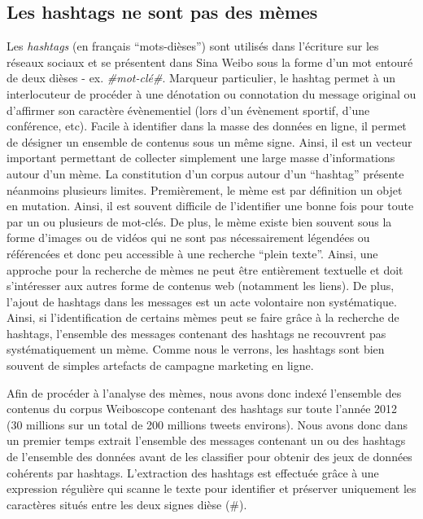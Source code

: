 \subsection[Les hashtags ne sont pas des mèmes]{Les hashtags ne sont pas des mèmes}
\label{sec:hashtags}

Les \textit{hashtags }(en fran\c{c}ais {\textquotedblleft}mots-dièses{\textquotedblright}) sont utilisés dans l{\textquoteright}écriture sur les réseaux sociaux et se présentent dans Sina Weibo sous la forme d{\textquoteright}un mot entouré de deux dièses - ex. \textit{\#mot-clé\#}. Marqueur particulier, le hashtag permet à un interlocuteur de procéder à une dénotation ou connotation du message original \citep{Romero2011} ou d{\textquoteright}affirmer son caractère évènementiel (lors d{\textquoteright}un évènement sportif, d{\textquoteright}une conférence, etc). Facile à identifier dans la masse des données en ligne, il permet de désigner un ensemble de contenus sous un m\^eme signe. Ainsi, il est un vecteur important permettant de collecter simplement une large masse d{\textquoteright}informations autour d{\textquoteright}un mème. La constitution d{\textquoteright}un corpus autour d{\textquoteright}un {\textquotedblleft}hashtag{\textquotedblright} présente néanmoins plusieurs limites. Premièrement, le mème est par définition un objet en mutation. Ainsi, il est souvent difficile de l{\textquoteright}identifier une bonne fois pour toute par un ou plusieurs de mot-clés. De plus, le mème existe bien souvent sous la forme d{\textquoteright}images ou de vidéos qui ne sont pas nécessairement légendées ou référencées et donc peu accessible à une recherche {\textquotedblleft}plein texte{\textquotedblright}. Ainsi, une approche pour la recherche de mèmes ne peut \^etre entièrement textuelle et doit s{\textquoteright}intéresser aux autres forme de contenus web (notamment les liens). De plus, l{\textquoteright}ajout de hashtags dans les messages est un acte volontaire non systématique. Ainsi, si l{\textquoteright}identification de certains mèmes peut se faire gr\^ace à la recherche de hashtags, l{\textquoteright}ensemble des messages contenant des hashtags ne recouvrent pas systématiquement un mème. Comme nous le verrons, les hashtags sont bien souvent de simples artefacts de campagne marketing en ligne.

Afin de procéder à l{\textquoteright}analyse des mèmes, nous avons donc indexé l{\textquoteright}ensemble des contenus du corpus Weiboscope contenant des hashtags sur toute l{\textquoteright}année 2012 (30 millions sur un total de 200 millions tweets environs). Nous avons donc dans un premier temps extrait l{\textquoteright}ensemble des messages contenant un ou des hashtags de l{\textquoteright}ensemble des données avant de les classifier pour obtenir des jeux de données cohérents par hashtags. L{\textquoteright}extraction des hashtags est effectuée gr\^ace à une expression régulière qui scanne le texte pour identifier et préserver uniquement les caractères situés entre les deux signes dièse (\#).



